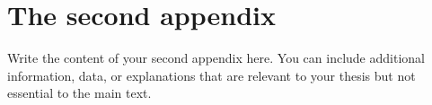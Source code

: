 \chapter{The second appendix}

Write the content of your second appendix here. You can include additional information, data, or explanations that are relevant to your thesis but not essential to the main text.
